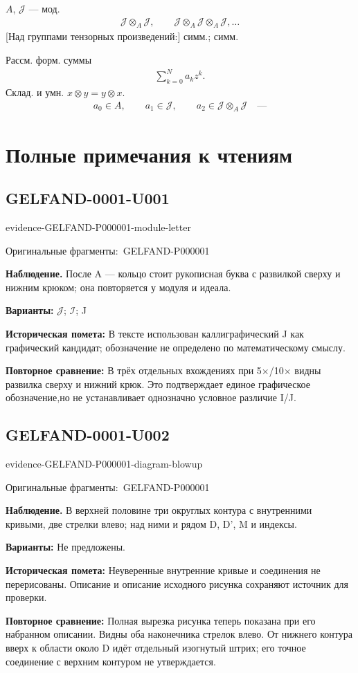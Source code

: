 \documentclass[11pt]{article}
\newcommand{\EvidenceBlock}[4]{%
 \par\smallskip\noindent\begin{minipage}{\linewidth}
 \begin{minipage}[t]{.47\linewidth}\vspace{0pt}\centering
 \csname evidence-#1-#2\endcsname\par
 {\scriptsize\SourceCropCaption\ #1}\par
 \end{minipage}\hfill
 \begin{minipage}[t]{.49\linewidth}\vspace{0pt}\raggedright
 {\small\color{orange!65!black}\textbf{#4} #3}\par
 \end{minipage}
 \end{minipage}\par\smallskip}
\newcommand{\SourceCropCaption}{Оригинальные фрагменты:}\newcommand{\ReadingCaption}{Сомнительное чтение.}\newcommand{\IncompleteCaption}{Неразобранный фрагмент.}\newcommand{\DiagramCaption}{Рисунок и набранное описание.}
\begin{document}
$A$, $\mathcal{J}$ — мод.
\begin{gather*}
 \mathcal{J}\otimes_A\mathcal{J},\qquad
 \mathcal{J}\otimes_A\mathcal{J}\otimes_A\mathcal{J},\ldots
\end{gather*}
[Над группами тензорных произведений:] симм.; симм.

Рассм. форм. суммы
\begin{gather*}
 \sum_{k=0}^{N}a_kz^k.
\end{gather*}
Склад. и умн.
$x\otimes y=y\otimes x$.
\begin{gather*}
 a_0\in A,\qquad a_1\in\mathcal{J},\qquad
 a_2\in\mathcal{J}\otimes_A\mathcal{J}\quad\text{—}
\end{gather*}



\clearpage\section*{Полные примечания к чтениям}
\subsection*{GELFAND-0001-U001}
\EvidenceBlock{GELFAND-P000001}{module-letter}{После A — кольцо стоит рукописная буква с развилкой сверху и нижним крюком; она повторяется у модуля и идеала.}{Наблюдение.}
\textbf{Варианты: } \(\mathcal{J}\); \(\mathcal{I}\); J\par
\textbf{Историческая помета: } В тексте использован каллиграфический J как графический кандидат; обозначение не определено по математическому смыслу.\par
\textbf{Повторное сравнение: } В трёх отдельных вхождениях при 5×/10× видны развилка сверху и нижний крюк. Это подтверждает единое графическое обозначение,но не устанавливает однозначно условное различие I/J.\par
\subsection*{GELFAND-0001-U002}
\EvidenceBlock{GELFAND-P000001}{diagram-blowup}{В верхней половине три округлых контура с внутренними кривыми, две стрелки влево; над ними и рядом D, D', M и индексы.}{Наблюдение.}
\textbf{Варианты: } Не предложены.\par
\textbf{Историческая помета: } Неуверенные внутренние кривые и соединения не перерисованы. Описание и описание исходного рисунка сохраняют источник для проверки.\par
\textbf{Повторное сравнение: } Полная вырезка рисунка теперь показана при его набранном описании. Видны оба наконечника стрелок влево. От нижнего контура вверх к области около D идёт отдельный изогнутый штрих; его точное соединение с верхним контуром не утверждается.\par
\end{document}
